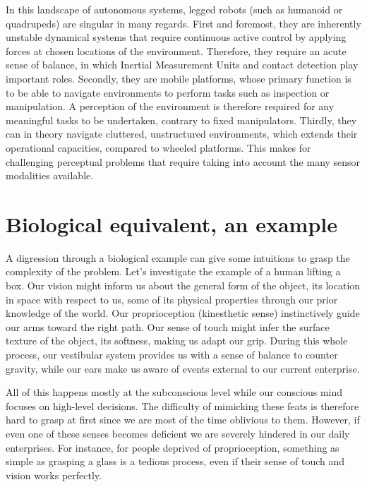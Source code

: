 In this landscape of autonomous systems, legged robots (such as humanoid 
or quadrupeds) are singular in many regards. 
First and foremost, they are inherently unstable dynamical systems that require continuous active control by applying forces at chosen locations of the environment. 
Therefore, they require an acute sense of balance, in which Inertial Measurement Units and contact detection play important roles. 
Secondly, they are mobile platforms, whose primary function is to be able to navigate environments to perform tasks such as inspection or manipulation.
A perception of the environment is therefore required for any meaningful tasks to be undertaken, contrary to fixed manipulators.
Thirdly, they can in theory navigate cluttered, unstructured environments, which extends their operational capacities, compared to wheeled platforms.
This makes for challenging perceptual problems that require taking into account the many sensor modalities available.


\section{Biological equivalent, an example}

A digression through a biological example can give some intuitions to grasp the complexity of the problem. 
Let's investigate the example of a human lifting a box. Our vision might inform us about the general form of the object, 
its location in space with respect to us, some of its physical properties through our prior knowledge of the world. Our proprioception (kinesthetic sense) 
instinctively guide our arms toward the right path. Our sense of touch might infer the surface texture of the object,  its softness, making us 
adapt our grip. During this whole process, our vestibular system provides us with a sense of balance to counter gravity, while our ears 
make us aware of events external to our current enterprise.

All of this happens mostly at the subconscious level while our conscious mind focuses on high-level decisions.
The difficulty of mimicking these feats is therefore hard to grasp at first since we are most of the time oblivious to them.
However, if even one of these senses becomes deficient we are severely hindered in our daily enterprises. For instance, for people deprived
of proprioception, something as simple as grasping a glass is a tedious process, even if their sense of touch and vision works perfectly.


